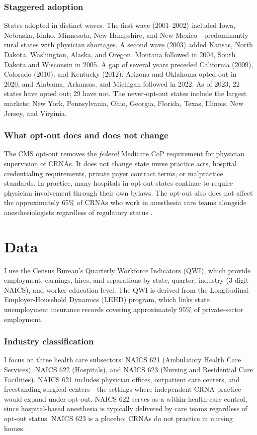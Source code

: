 \documentclass[12pt]{article}
\begin{document}
\subsubsection*{Staggered adoption} States adopted in distinct waves. The first wave (2001--2002) included Iowa, Nebraska, Idaho, Minnesota, New Hampshire, and New Mexico---predominantly rural states with physician shortages. A second wave (2003) added Kansas, North Dakota, Washington, Alaska, and Oregon. Montana followed in 2004, South Dakota and Wisconsin in 2005. A gap of several years preceded California (2009), Colorado (2010), and Kentucky (2012). Arizona and Oklahoma opted out in 2020, and Alabama, Arkansas, and Michigan followed in 2022. As of 2023, 22 states have opted out; 29 have not. The never-opt-out states include the largest markets: New York, Pennsylvania, Ohio, Georgia, Florida, Texas, Illinois, New Jersey, and Virginia.

\subsubsection*{What opt-out does and does not change} The CMS opt-out removes the \emph{federal} Medicare CoP requirement for physician supervision of CRNAs. It does not change state nurse practice acts, hospital credentialing requirements, private payer contract terms, or malpractice standards. In practice, many hospitals in opt-out states continue to require physician involvement through their own bylaws. The opt-out also does not affect the approximately 65\% of CRNAs who work in anesthesia care teams alongside anesthesiologists regardless of regulatory status \citep{negrusa2016scope}.


\section{Data}

I use the Census Bureau's Quarterly Workforce Indicators (QWI), which provide employment, earnings, hires, and separations by state, quarter, industry (3-digit NAICS), and worker education level. The QWI is derived from the Longitudinal Employer-Household Dynamics (LEHD) program, which links state unemployment insurance records covering approximately 95\% of private-sector employment.

\subsubsection*{Industry classification} I focus on three health care subsectors: NAICS 621 (Ambulatory Health Care Services), NAICS 622 (Hospitals), and NAICS 623 (Nursing and Residential Care Facilities). NAICS 621 includes physician offices, outpatient care centers, and freestanding surgical centers---the settings where independent CRNA practice would expand under opt-out. NAICS 622 serves as a within-health-care control, since hospital-based anesthesia is typically delivered by care teams regardless of opt-out status. NAICS 623 is a placebo: CRNAs do not practice in nursing homes.
\end{document}
